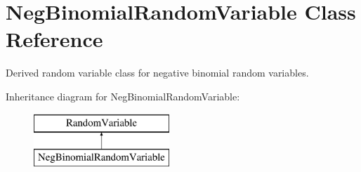 \section{Neg\+Binomial\+Random\+Variable Class Reference}
\label{classPecos_1_1NegBinomialRandomVariable}


Derived random variable class for negative binomial random variables.  


Inheritance diagram for Neg\+Binomial\+Random\+Variable\+:\begin{figure}[H]
\begin{center}
\leavevmode
\includegraphics[height=2.000000cm]{classPecos_1_1NegBinomialRandomVariable}
\end{center}
\end{figure}
